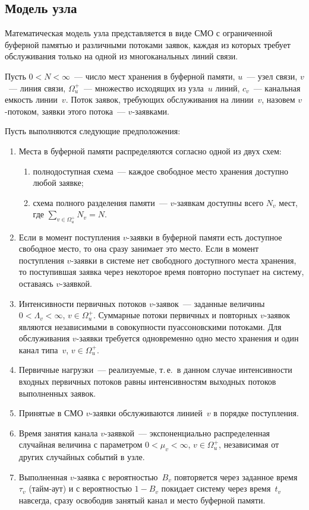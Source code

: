 \begin{multicols}{2}
\section{Модель узла}

    Математическая модель узла представляется в виде СМО с ограниченной 
буферной памятью и различными потоками заявок, каждая из которых требует 
обслуживания только на одной из многоканальных линий связи. 

    Пусть $0<N<\infty$~--- число мест хранения в буферной памяти, $u$~--- 
узел связи, $v$~--- линия связи, $\Omega_u^+$~--- множество исходящих из 
узла~$u$ линий, $c_v$~--- канальная емкость линии~$v$. Поток заявок, 
тре\-бу\-ющих обслуживания на линии~$v$, назовем $v$-по\-то\-ком, заявки этого 
потока~--- $v$-за\-яв\-ка\-ми.


    Пусть выполняются следующие предположения: 
\begin{enumerate}[1.]
\item Места в буферной памяти распределяются согласно одной из двух 
схем:
\begin{enumerate}[($i$)]
\item полнодоступная схема~--- каждое свободное место хранения доступно 
любой заявке;
\item схема полного разделения памяти~--- $v$-за\-яв\-кам доступны всего 
$N_v$ мест, где $\sum\limits_{v\in\Omega_u^+} N_v=N$.
\end{enumerate}
\item Если в момент поступления $v$-заявки в буферной памяти есть 
доступное свободное место, то она сразу занимает это место. Если в момент 
поступления $v$-заявки в системе нет свободного доступного места 
хранения, то поступившая заявка через некоторое время повторно поступает 
на систему, оставаясь $v$-заявкой. 
\item Интенсивности первичных потоков $v$-заявок~--- заданные величины 
$0<\Lambda_v<\infty$, $v\in \Omega_u^+$. Суммарные потоки первичных и 
повторных $v$-заявок являются независимыми в совокупности 
пуассоновскими потоками. Для обслуживания $v$-заявки требуется 
одновременно одно место хранения и один канал типа~$v$, $v\in 
\Omega_u^+$.
\item Первичные нагрузки~--- реализуемые, т.\,е.\ в данном случае 
интенсивности входных первичных потоков равны интенсивностям 
выходных потоков выполненных заявок. 
\item Принятые в СМО $v$-заявки обслуживаются линией~$v$ в порядке 
поступления. 
\item Время занятия канала $v$-заявкой~--- экспоненциально 
распределенная случайная величина с параметром $0<\mu_v<\infty$, 
$v\in\Omega_u^+$, независимая от других случайных событий в узле.
\item Выполненная $v$-заявка с вероятностью~$B_v$ повторяется через 
заданное время~$\tau_v$ (тайм-аут) и с вероятностью $1-B_v$ покидает 
систему через время~$t_v$ навсегда, сразу освободив занятый канал и место 
буферной памяти.
\end{enumerate}


\end{multicols}
